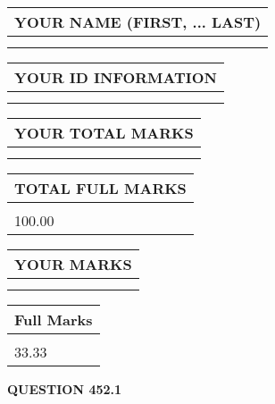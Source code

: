 \documentclass{ctexart}
\begin{document}
   
   
   
\newpage 
\setcounter{page}{ 
   452001 } 
   
   
   
   
\noindent\begin{tabular}{|l|}
\hline
YOUR NAME (FIRST, ... LAST)  \\
\hline
 \\ 
 \\ 
\hline
\end{tabular}
\hspace{0.05in} \begin{tabular}{|l|}
\hline
 YOUR   ID   INFORMATION  \\
\hline
 \\ 
 \\ 
\hline
\end{tabular}
   
   
\vspace{0.2in}\noindent\begin{tabular}{|l|}
\hline
YOUR TOTAL MARKS  \\
\hline
 \\ 
 \\ 
\hline
\end{tabular}
\hspace{0.05in} \begin{tabular}{|l|}
\hline
TOTAL FULL MARKS  \\
\hline
 \\ 
100.00 \\
\hline
\end{tabular}
   
   
 \vspace{0.2in}
 
 
 
 
   
   
  
\vspace{0.2in}
  
\noindent\begin{tabular}{|l|}
\hline
 YOUR MARKS  \\
\hline
 \\ 
 \\ 
\hline
\end{tabular}
\hspace{0.05in} \begin{tabular}{|l|}
\hline
 Full Marks  \\
\hline
 \\ 
33.33 \\
\hline
\end{tabular}
{\textbf{\Large{QUESTION
452.1 
}}}
  
\end{document}
